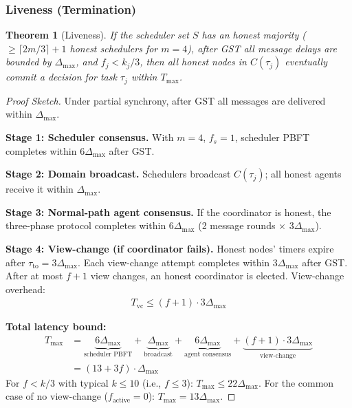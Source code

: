\documentclass[manuscript,screen,review]{acmart}
\newtheorem{theorem}{Theorem}
\begin{document}
\subsubsection{Liveness (Termination)}
\label{sec:liveness_theorem}

\begin{theorem}[Liveness]
\label{thm:liveness}
If the scheduler set $S$ has an honest majority ($\geq \lceil 2m/3 \rceil + 1$ honest schedulers for $m=4$), after GST all message delays are bounded by $\Delta_{\max}$, and $f_j < k_j/3$, then all honest nodes in $C(\tau_j)$ eventually commit a decision for task $\tau_j$ within $T_{\max}$.
\end{theorem}

\begin{proof}[Proof Sketch]
Under partial synchrony, after GST all messages are delivered within $\Delta_{\max}$.

\textbf{Stage 1: Scheduler consensus.} With $m=4$, $f_s=1$, scheduler PBFT completes within $6\Delta_{\max}$ after GST.

\textbf{Stage 2: Domain broadcast.} Schedulers broadcast $C(\tau_j)$; all honest agents receive it within $\Delta_{\max}$.

\textbf{Stage 3: Normal-path agent consensus.} If the coordinator is honest, the three-phase protocol completes within $6\Delta_{\max}$ (2 message rounds $\times$ $3\Delta_{\max}$).

\textbf{Stage 4: View-change (if coordinator fails).} Honest nodes' timers expire after $\tau_{\text{to}} = 3\Delta_{\max}$. Each view-change attempt completes within $3\Delta_{\max}$ after GST. After at most $f+1$ view changes, an honest coordinator is elected. View-change overhead:
\begin{equation}
\begin{aligned}
T_{\text{vc}} \leq (f+1) \cdot 3\Delta_{\max}
\label{eq:vc_latency}
\end{aligned}
\end{equation}

\textbf{Total latency bound:}
\begin{equation}
\begin{aligned}
T_{\max} &= \underbrace{6\Delta_{\max}}_{\text{scheduler PBFT}}
          + \underbrace{\Delta_{\max}}_{\text{broadcast}}
          + \underbrace{6\Delta_{\max}}_{\text{agent consensus}}
          + \underbrace{(f+1) \cdot 3\Delta_{\max}}_{\text{view-change}} \\
         &= (13 + 3f) \cdot \Delta_{\max}
\label{eq:tmax}
\end{aligned}
\end{equation}
For $f < k/3$ with typical $k \leq 10$ (i.e., $f \leq 3$): $T_{\max} \leq 22\Delta_{\max}$. For the common case of no view-change ($f_{\text{active}} = 0$): $T_{\max} = 13\Delta_{\max}$.
\end{proof}
\end{document}
